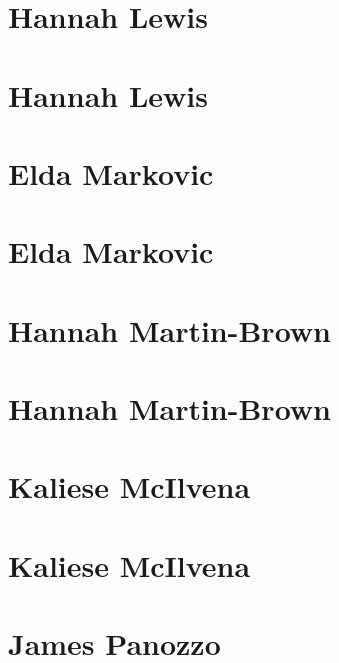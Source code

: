 \documentclass[twoside,14pt,a4paper,notitlepage]{memoir}
\begin{document}
\section*{Hannah Lewis}
\label{aut:lewis}

\lipsum[1-2]
\section*{Hannah Lewis}
\lipsum[3]



\section*{Elda Markovic}
\label{aut:markovic}

\lipsum[1-2]
\section*{Elda Markovic}
\lipsum[3]



\section*{Hannah Martin-Brown}
\label{aut:brown}

\lipsum[1-2]
\section*{Hannah Martin-Brown}
\lipsum[3]



\section*{Kaliese McIlvena}
\label{aut:mcilvena}

\lipsum[1-2]
\section*{Kaliese McIlvena}
\lipsum[3]



\section*{James Panozzo}
\label{aut:panozzo}
\end{document}
